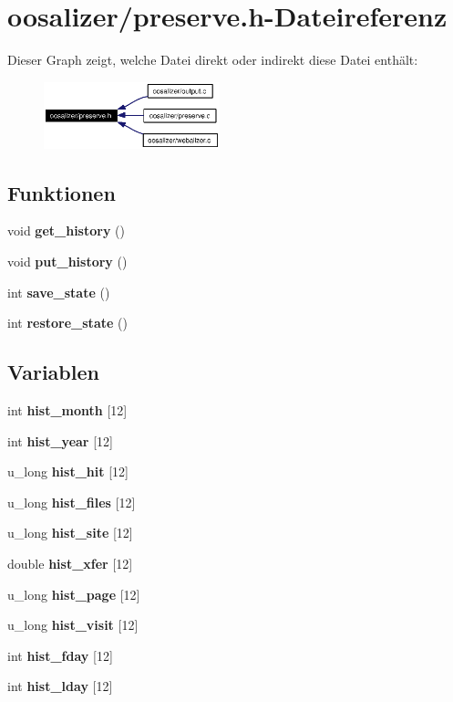 \section{oosalizer/preserve.h-Dateireferenz}
\label{preserve_8h}


Dieser Graph zeigt, welche Datei direkt oder indirekt diese Datei enth\"{a}lt:\begin{figure}[H]
\begin{center}
\leavevmode
\includegraphics[width=145pt]{preserve_8h__dep__incl}
\end{center}
\end{figure}
\subsection*{Funktionen}
\begin{CompactItemize}
\item 
void {\bf get\_\-history} ()
\item 
void {\bf put\_\-history} ()
\item 
int {\bf save\_\-state} ()
\item 
int {\bf restore\_\-state} ()
\end{CompactItemize}
\subsection*{Variablen}
\begin{CompactItemize}
\item 
int {\bf hist\_\-month} [12]
\item 
int {\bf hist\_\-year} [12]
\item 
u\_\-long {\bf hist\_\-hit} [12]
\item 
u\_\-long {\bf hist\_\-files} [12]
\item 
u\_\-long {\bf hist\_\-site} [12]
\item 
double {\bf hist\_\-xfer} [12]
\item 
u\_\-long {\bf hist\_\-page} [12]
\item 
u\_\-long {\bf hist\_\-visit} [12]
\item 
int {\bf hist\_\-fday} [12]
\item 
int {\bf hist\_\-lday} [12]
\end{CompactItemize}


